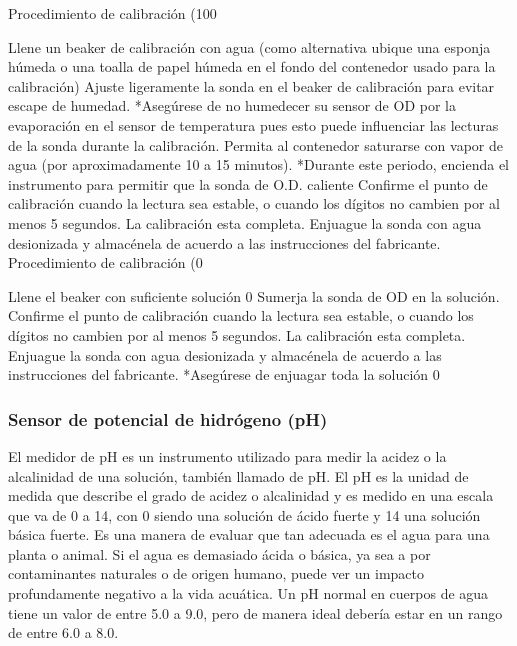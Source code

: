 Procedimiento de calibración (100%

Llene un beaker de calibración con agua (como alternativa ubique una esponja húmeda o una toalla de papel húmeda en el fondo del contenedor usado para la calibración)
Ajuste ligeramente la sonda en el beaker de calibración para evitar escape de humedad. *Asegúrese de no humedecer su sensor de OD por la evaporación en el sensor de temperatura pues esto puede influenciar las lecturas de la sonda durante la calibración.
Permita al contenedor saturarse con vapor de agua (por aproximadamente 10 a 15 minutos). *Durante este periodo, encienda el instrumento para permitir que la sonda de O.D. caliente
Confirme el punto de calibración cuando la lectura sea estable, o cuando los dígitos no cambien por al menos 5 segundos.
La calibración esta completa. Enjuague la sonda con agua desionizada y almacénela de acuerdo a las instrucciones del fabricante.
Procedimiento de calibración (0%

Llene el beaker con suficiente solución 0%
Sumerja la sonda de OD en la solución.
Confirme el punto de calibración cuando la lectura sea estable, o cuando los dígitos no cambien por al menos 5 segundos.
La calibración esta completa. Enjuague la sonda con agua desionizada y almacénela de acuerdo a las instrucciones del fabricante. *Asegúrese de enjuagar toda la solución 0%





















\subsubsection{Sensor de potencial de hidrógeno (pH)}

El medidor de pH es un instrumento utilizado para medir la acidez o la alcalinidad de una solución, también llamado de pH. El pH es la unidad de medida que describe el grado de acidez o alcalinidad y es medido en una escala que va de 0 a 14, con 0 siendo una solución de ácido fuerte y 14 una solución básica fuerte.
Es una manera de evaluar que tan adecuada es el agua para una planta o animal.  Si el agua es demasiado ácida o básica, ya sea a por contaminantes naturales o de origen humano, puede ver un impacto profundamente negativo a la vida acuática.  Un pH normal en cuerpos de agua tiene un valor de entre 5.0 a 9.0, pero de manera ideal debería estar en un rango de entre 6.0 a 8.0. %

